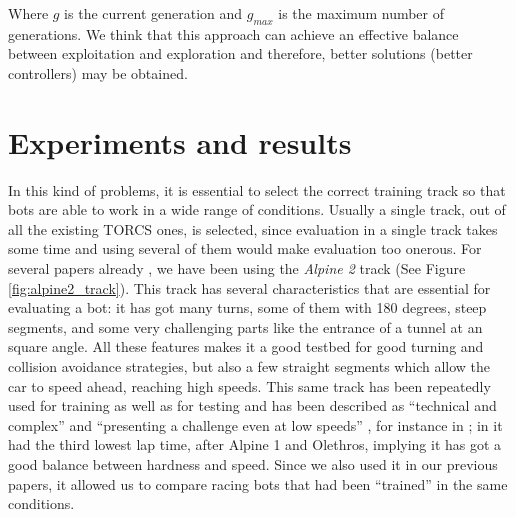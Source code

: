 \documentclass[10pt,journal,compsoc]{IEEEtran}
\begin{document}
Where $g$ is the current generation and $g_{max}$ is the maximum number of generations. We think that this approach can achieve an effective balance between exploitation and exploration and therefore, better solutions (better controllers) may be obtained.



\section{Experiments and results}  
\label{sec:results}


In this kind of problems, it is essential to select the correct
training track so that bots are able to work in a wide range of
conditions. Usually a single track, out of all the existing TORCS
ones, is selected, since evaluation in a single track takes some time
and using several of them would make evaluation too onerous. For
several papers already \cite{salem_cig2018,DBLP:conf/cig/SalemMG19},
we have been using the \textit{Alpine 2} track (See Figure
\ref{fig:alpine2_track}). This track has several characteristics that
are essential for evaluating a bot: it has got many turns, some of
them with 180 degrees, steep segments, and some very challenging parts
like the entrance of a tunnel at an square angle. All these features makes
it a good testbed for good turning and collision avoidance
strategies, but also a few straight segments which allow the car to
speed ahead, reaching high speeds. This same track has been repeatedly
used for training as well as for testing and has been described as
``technical and complex'' \cite{AG} and ``presenting a challenge even
at low speeds'' \cite{vrajitoru2018global}, for instance in
\cite{cardamone2010applying,CarRacing_Pelta09,zong2017obstacle}; in \cite{AG} it had the third lowest lap time, after Alpine 1 and Olethros, implying it
has got a good balance between hardness and speed. Since we also used
it in our previous papers, it allowed us to compare racing bots that
had been ``trained'' in the same conditions.
\end{document}
